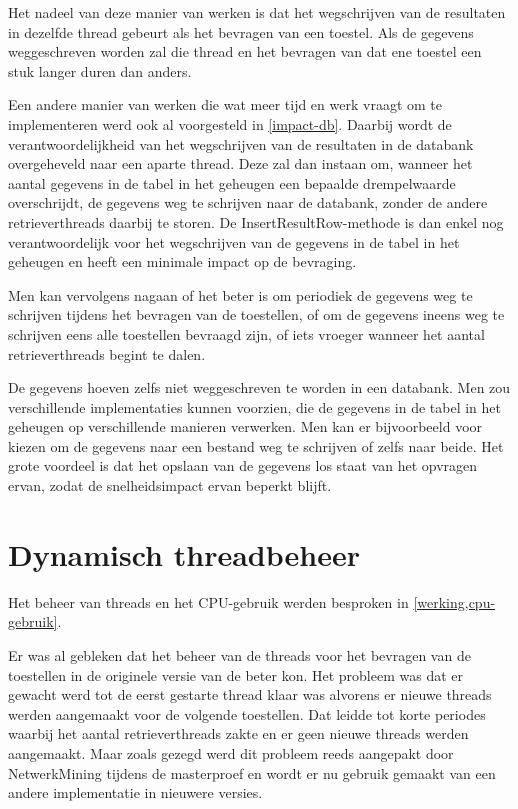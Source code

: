 Het nadeel van deze manier van werken is dat het wegschrijven van de resultaten in dezelfde thread gebeurt als het bevragen van een toestel.
Als de gegevens weggeschreven worden zal die thread en het bevragen van dat ene toestel een stuk langer duren dan anders.

Een andere manier van werken die wat meer tijd en werk vraagt om te implementeren werd ook al voorgesteld in \cref{impact-db}.
Daarbij wordt de verantwoordelijkheid van het wegschrijven van de resultaten in de databank overgeheveld naar een aparte thread.
Deze zal dan instaan om, wanneer het aantal gegevens in de tabel in het geheugen een bepaalde drempelwaarde overschrijdt,
de gegevens weg te schrijven naar de databank, zonder de andere retrieverthreads daarbij te storen.
De InsertResultRow-methode is dan enkel nog verantwoordelijk voor het wegschrijven van de gegevens in de tabel in het geheugen en heeft een minimale impact op de bevraging.

Men kan vervolgens nagaan of het beter is om periodiek de gegevens weg te schrijven tijdens het bevragen van de toestellen,
of om de gegevens ineens weg te schrijven eens alle toestellen bevraagd zijn, of iets vroeger wanneer het aantal retrieverthreads begint te dalen.

De gegevens hoeven zelfs niet weggeschreven te worden in een databank.
Men zou verschillende implementaties kunnen voorzien, die de gegevens in de tabel in het geheugen op verschillende manieren verwerken.
Men kan er bijvoorbeeld voor kiezen om de gegevens naar een bestand weg te schrijven of zelfs naar beide.
Het grote voordeel is dat het opslaan van de gegevens los staat van het opvragen ervan, zodat de snelheidsimpact ervan beperkt blijft.


\section{Dynamisch threadbeheer}

Het beheer van threads en het CPU-gebruik werden besproken in \cref{werking,cpu-gebruik}.

Er was al gebleken dat het beheer van de threads voor het bevragen van de toestellen in de originele versie van de \nwmretriever{} beter kon.
Het probleem was dat er gewacht werd tot de eerst gestarte thread klaar was alvorens er nieuwe threads werden aangemaakt voor de volgende toestellen.
Dat leidde tot korte periodes waarbij het aantal retrieverthreads zakte en er geen nieuwe threads werden aangemaakt.
Maar zoals gezegd werd dit probleem reeds aangepakt door NetwerkMining tijdens de masterproef en
wordt er nu gebruik gemaakt van een andere implementatie in nieuwere versies.


